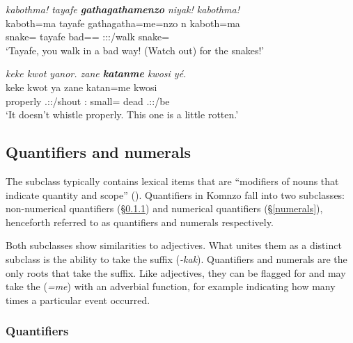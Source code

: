 \begin{exe}
	\ex \emph{kabothma! tayafe \textbf{gathagathamenzo} niyak! kabothma!}\\
	\gll kaboth=ma tayafe {gathagatha=me=nzo} n kaboth=ma\\
	snake=\Char{} tayafe bad=\Ins=\Only{} \Ssg:\Sbj:\Nonpast:\Ipfv/walk snake=\Char{}\\
	\trans `Tayafe, you walk in a bad way! (Watch out) for the snakes!'\\
	\label{ex050}
\end{exe}
\begin{exe}
	\ex \emph{keke kwot yanor. zane \textbf{katanme} kwosi yé.}\\
	\gll keke kwot ya zane katan=me kwosi \\
	\Neg{} properly \Tsg.\Masc:\Sbj:\Nonpast/shout \Dem:\Prox{} small=\Ins{} dead \Tsg.\Masc:\Nonpast:\Ipfv/be\\
	\trans `It doesn't whistle properly. This one is a little rotten.'\\
	\label{ex043}
\end{exe}

\subsection{Quantifiers and numerals} \label{numquant}

The  subclass typically contains lexical items that are ``modifiers of nouns that indicate quantity and scope'' (\citealt[37]{Schachter:2007vv}). Quantifiers in Komnzo fall into two subclasses: non-numerical quantifiers (\S{}\ref{quantifiers}) and numerical quantifiers (\S{}\ref{numerals}), henceforth referred to as quantifiers and numerals respectively.%

Both subclasses show similarities to adjectives. What unites them as a distinct subclass is the ability to take the  suffix (\emph{-kak}). Quantifiers and numerals are the only roots that take the  suffix. Like adjectives, they can be flagged for  and may take the   (\emph{=me}) with an adverbial function, for example indicating how many times a particular event occurred.

\subsubsection{Quantifiers} \label{quantifiers}

